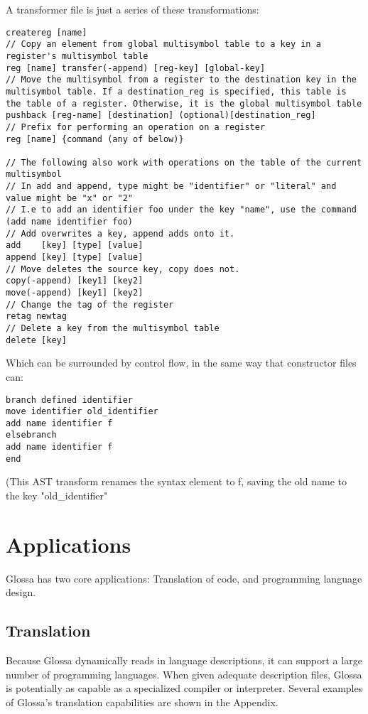\documentclass{article}
\begin{document}
A transformer file is just a series of these transformations:
\begin{verbatim}
createreg [name]
// Copy an element from global multisymbol table to a key in a register's multisymbol table
reg [name] transfer(-append) [reg-key] [global-key]
// Move the multisymbol from a register to the destination key in the multisymbol table. If a destination_reg is specified, this table is the table of a register. Otherwise, it is the global multisymbol table
pushback [reg-name] [destination] (optional)[destination_reg]
// Prefix for performing an operation on a register
reg [name] {command (any of below)} 

// The following also work with operations on the table of the current multisymbol
// In add and append, type might be "identifier" or "literal" and value might be "x" or "2"
// I.e to add an identifier foo under the key "name", use the command (add name identifier foo)
// Add overwrites a key, append adds onto it.
add    [key] [type] [value]
append [key] [type] [value]
// Move deletes the source key, copy does not.
copy(-append) [key1] [key2]
move(-append) [key1] [key2]
// Change the tag of the register
retag newtag
// Delete a key from the multisymbol table
delete [key]
\end{verbatim}
Which can be surrounded by control flow, in the same way that constructor files can:
\begin{verbatim}
branch defined identifier 
move identifier old_identifier
add name identifier f
elsebranch
add name identifier f
end
\end{verbatim}
(This AST transform renames the syntax element to f, saving the old name to the key "old\_identifier"

\section{Applications}

Glossa has two core applications: Translation of code, and programming language design.

\subsection{Translation}

Because Glossa dynamically reads in language descriptions, it can support a large number of programming languages.
When given adequate description files, Glossa is potentially as capable as a specialized compiler or interpreter.
Several examples of Glossa's translation capabilities are shown in the Appendix.
\end{document}
